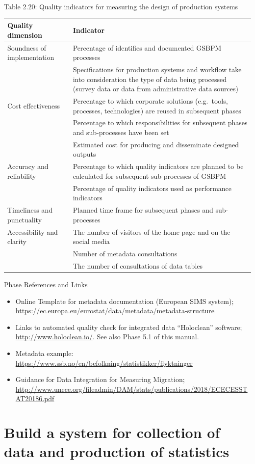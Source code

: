 \documentclass[
]{article}
\begin{document}
Table 2.20: Quality indicators for measuring the design of production
systems

\begin{longtable}[]{@{}ll@{}}
\toprule
\textbf{Quality dimension} & \textbf{Indicator}\tabularnewline
\midrule
\endhead
Soundness of implementation & Percentage of identifies and documented GSBPM processes\tabularnewline
& Specifications for production systems and workflow take into consideration the type of data being processed (survey data or data from administrative data sources)\tabularnewline
Cost effectiveness & Percentage to which corporate solutions (e.g.~tools, processes, technologies) are reused in subsequent phases\tabularnewline
& Percentage to which responsibilities for subsequent phases and sub-processes have been set\tabularnewline
& Estimated cost for producing and disseminate designed outputs\tabularnewline
Accuracy and reliability & Percentage to which quality indicators are planned to be calculated for subsequent sub-processes of GSBPM\tabularnewline
& Percentage of quality indicators used as performance indicators\tabularnewline
Timeliness and punctuality & Planned time frame for subsequent phases and sub-processes\tabularnewline
Accessibility and clarity & The number of visitors of the home page and on the social media\tabularnewline
& Number of metadata consultations\tabularnewline
& The number of consultations of data tables\tabularnewline
\bottomrule
\end{longtable}

Phase References and Links

\begin{itemize}
\item
  Online Template for metadata documentation (European SIMS system);
  \url{https://ec.europa.eu/eurostat/data/metadata/metadata-structure}
\item
  Links to automated quality check for integrated data ``Holoclean''
  software; \url{http://www.holoclean.io/}. See also Phase 5.1 of this
  manual.
\item
  Metadata example:
  \url{https://www.ssb.no/en/befolkning/statistikker/flyktninger}
\item
  Guidance for Data Integration for Measuring Migration;
  \url{http://www.unece.org/fileadmin/DAM/stats/publications/2018/ECECESSTAT20186.pdf}
\end{itemize}

\hypertarget{build-a-system-for-collection-of-data-and-production-of-statistics}{%
\section{Build a system for collection of data and production of statistics}\label{build-a-system-for-collection-of-data-and-production-of-statistics}}
\end{document}
